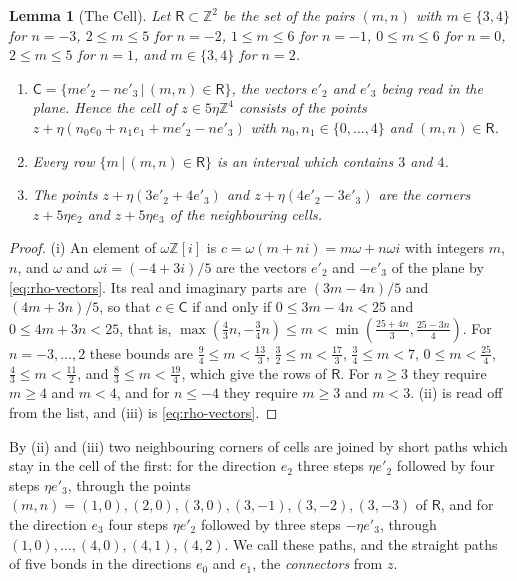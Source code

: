 \documentclass[11pt]{preprint}
\numberwithin{equation}{section}
\newtheorem{lemma}[theorem]{Lemma}
\theoremstyle{definition}
\theoremstyle{remark}
\theoremstyle{plain}
\begin{document}
\begin{lemma}[The Cell]\label{lem:cell}
Let $\mathsf R \subset \mathbb Z^2$ be the set of the pairs $(m, n)$ with $m \in \{ 3, 4 \}$ for $n = -3$, $2 \leq m \leq 5$ for $n = -2$, $1 \leq m \leq 6$ for $n = -1$, $0 \leq m \leq 6$ for $n = 0$, $2 \leq m \leq 5$ for $n = 1$, and $m \in \{ 3, 4 \}$ for $n = 2$.
\begin{enumerate}[label=(\roman*)]
\item $\mathsf C = \{ me'_2 - ne'_3 \, | \, (m, n) \in \mathsf R \}$, the vectors $e'_2$ and $e'_3$ being read in the plane. Hence the cell of $z \in 5\eta\mathbb Z^4$ consists of the points $z + \eta(n_0e_0 + n_1e_1 + me'_2 - ne'_3)$ with $n_0, n_1 \in \{ 0, \dots, 4 \}$ and $(m, n) \in \mathsf R$.
\item Every row $\{ m \, | \, (m, n) \in \mathsf R \}$ is an interval which contains $3$ and $4$.
\item The points $z + \eta(3e'_2 + 4e'_3)$ and $z + \eta(4e'_2 - 3e'_3)$ are the corners $z + 5\eta e_2$ and $z + 5\eta e_3$ of the neighbouring cells.
\end{enumerate}
\end{lemma}

\begin{proof}
(i) An element of $\omega\mathbb Z[i]$ is $c = \omega(m + ni) = m\omega + n\omega i$ with integers $m$, $n$, and $\omega$ and $\omega i = (-4 + 3i)/5$ are the vectors $e'_2$ and $-e'_3$ of the plane by \eqref{eq:rho-vectors}. Its real and imaginary parts are $(3m - 4n)/5$ and $(4m + 3n)/5$, so that $c \in \mathsf C$ if and only if $0 \leq 3m - 4n < 25$ and $0 \leq 4m + 3n < 25$, that is, $\max(\frac43n, -\frac34n) \leq m < \min(\frac{25 + 4n}{3}, \frac{25 - 3n}{4})$. For $n = -3, \dots, 2$ these bounds are $\frac94 \leq m < \frac{13}{3}$, $\frac32 \leq m < \frac{17}{3}$, $\frac34 \leq m < 7$, $0 \leq m < \frac{25}{4}$, $\frac43 \leq m < \frac{11}{2}$, and $\frac83 \leq m < \frac{19}{4}$, which give the rows of $\mathsf R$. For $n \geq 3$ they require $m \geq 4$ and $m < 4$, and for $n \leq -4$ they require $m \geq 3$ and $m < 3$. (ii) is read off from the list, and (iii) is \eqref{eq:rho-vectors}.
\end{proof}

By (ii) and (iii) two neighbouring corners of cells are joined by short paths which stay in the cell of the first: for the direction $e_2$ three steps $\eta e'_2$ followed by four steps $\eta e'_3$, through the points $(m, n) = (1, 0), (2, 0), (3, 0), (3, -1), (3, -2), (3, -3)$ of $\mathsf R$, and for the direction $e_3$ four steps $\eta e'_2$ followed by three steps $-\eta e'_3$, through $(1, 0), \dots, (4, 0), (4, 1), (4, 2)$. We call these paths, and the straight paths of five bonds in the directions $e_0$ and $e_1$, the \emph{connectors} from $z$.
\end{document}
